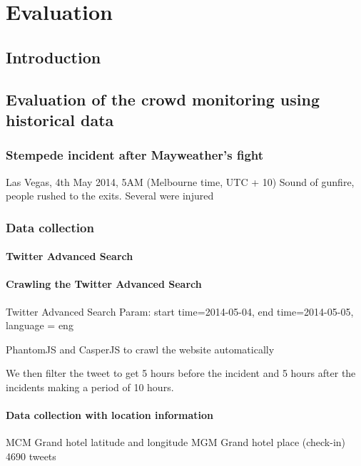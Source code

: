 \chapter{Evaluation}

\ifpdf
    \graphicspath{{Chapter5/Figs/Raster/}{Chapter5/Figs/PDF/}{Chapter5/Figs/}}
\else
    \graphicspath{{Chapter5/Figs/Vector/}{Chapter5/Figs/}}
\fi

\section{Introduction}

\section{Evaluation of the crowd monitoring using historical data}

\subsection{Stempede incident after Mayweather's fight}
Las Vegas, 4th May 2014, 5AM (Melbourne time, UTC + 10) 
Sound of gunfire, people rushed to the exits. Several were injured

\subsection{Data collection}

\subsubsection{Twitter Advanced Search}

\subsubsection{Crawling the Twitter Advanced Search}
Twitter Advanced Search
Param: start time=2014-05-04, end time=2014-05-05, language = eng

PhantomJS and CasperJS to crawl the website automatically

We then filter the tweet to get 5 hours before the incident and 5 hours after the incidents making a period of 10 hours.
\subsubsection{Data collection with location information}
MCM Grand hotel latitude and longitude
MGM Grand hotel place (check-in)
4690 tweets
